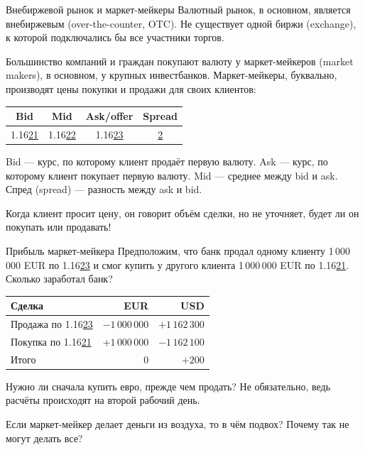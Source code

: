 \documentclass{beamer}
\newcommand{\eurusdBigFigures}{1.16}
\newcommand{\eurusdBigFiguresPerMillion}{1\,16}
\begin{document}
\begin{frame}{Внебиржевой рынок и маркет-мейкеры}
\justify
Валютный рынок, в основном, является \alert{внебиржевым} (over-the-counter, OTC). Не 
существует одной биржи (exchange), к которой подключались бы все участники торгов.

\justify
Большинство компаний и граждан покупают валюту у маркет-мейкеров (market makers), в 
основном, у крупных инвестбанков. Маркет-мейкеры, буквально, производят цены покупки 
и продажи для своих клиентов:

\centering
\begin{tabular}{c|c|c|c}
Bid & Mid & Ask/offer & Spread \\ \hline
\eurusdBigFigures\underline{21} & \eurusdBigFigures\underline{22} & \eurusdBigFigures\underline{23} & \underline{2}
\end{tabular}

\justify
Bid --- курс, по которому клиент продаёт первую валюту. Ask --- курс, по которому клиент 
покупает первую валюту. Mid --- среднее между bid и ask. Спред (spread) --- разность между 
ask и bid.

\justify
Когда клиент просит цену, он говорит объём сделки, но не уточняет, будет ли он покупать или продавать!
\end{frame}



\begin{frame}{Прибыль маркет-мейкера}
\justify
Предположим, что банк продал одному клиенту 1\,000\,000 EUR по \eurusdBigFigures\underline{23} и
смог купить у другого клиента 1\,000\,000 EUR по \eurusdBigFigures\underline{21}. Сколько 
заработал банк?

\centering
\begin{tabular}{l|r|r}
Сделка & EUR & USD \\
\hline
Продажа по \eurusdBigFigures\underline{23} & $-1\,000\,000$ & $+\eurusdBigFiguresPerMillion2\,300$ \\
Покупка по \eurusdBigFigures\underline{21} & $+1\,000\,000$ & $-\eurusdBigFiguresPerMillion2\,100$ \\
\hline
Итого & 0 & $+200$
\end{tabular}

\justify
Нужно ли сначала купить евро, прежде чем продать? Не обязательно, ведь расчёты 
происходят на второй рабочий день.

\justify
Если маркет-мейкер делает деньги из воздуха, то в чём подвох? Почему так не могут
делать все?
\end{frame}
\end{document}
